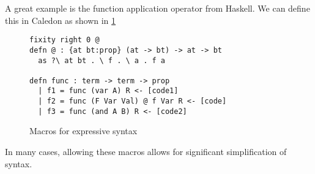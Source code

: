 A great example is the function application operator from Haskell.  
We can define this in Caledon as shown in \ref{code:macros}

\begin{figure}[H]
\begin{lstlisting}
fixity right 0 @
defn @ : {at bt:prop} (at -> bt) -> at -> bt
  as ?\ at bt . \ f . \ a . f a

defn func : term -> term -> prop 
  | f1 = func (var A) R <- [code1]
  | f2 = func (F Var Val) @ f Var R <- [code]
  | f3 = func (and A B) R <- [code2]
\end{lstlisting}
\caption{Macros for expressive syntax}
\label{code:macros}
\end{figure}

In many cases, allowing these macros allows for significant simplification of syntax.
